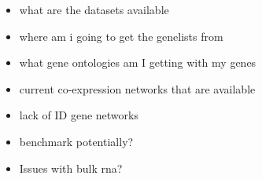 \documentclass[12pt]{article}
\begin{document}
\begin{itemize}
	
	\item what are the datasets available 
	\item where am i going to get the genelists from 
	\item what gene ontologies am I getting with my genes 
	\item current co-expression networks that are available
	\item lack of ID gene networks 
	\item benchmark potentially?
	\item Issues with bulk rna? 
	
\end{itemize}
\end{document}
